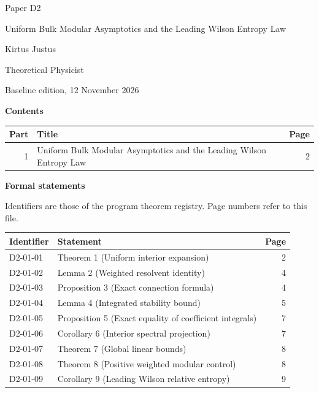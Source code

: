 \documentclass[11pt,a4paper]{article}
\begin{document}
\thispagestyle{empty}\pagestyle{empty}
{\small\sffamily \ProgramTitle\hfill Paper D2\par}
\vspace*{12mm}
{\LARGE\bfseries\raggedright{} Uniform Bulk Modular Asymptotics and the Leading Wilson Entropy Law\par}
\vspace{9mm}
{\large Kirtus Justus\par}\vspace{1mm}Theoretical Physicist\par\AuthorLocation\par\vspace{2mm}Baseline edition, 12 November 2026\par\vspace{8mm}
\textbf{Contents}\par\vspace{1mm}
{\small\begin{longtable}{@{}r>{\raggedright\arraybackslash}p{}r@{}}
\toprule Part & Title & Page\\\midrule\endhead
1 & Uniform Bulk Modular Asymptotics and the Leading Wilson Entropy Law & 2\\
\bottomrule\end{longtable}}
\vspace{2mm}\textbf{Formal statements}\par\vspace{1mm}
{\footnotesize Identifiers are those of the program theorem registry. Page numbers refer to this file.\par}
{\footnotesize\begin{longtable}{@{}l>{\raggedright\arraybackslash}p{}r@{}}
\toprule Identifier & Statement & Page\\\midrule\endhead
D2-01-01 & Theorem 1 (Uniform interior expansion) & 2\\
D2-01-02 & Lemma 2 (Weighted resolvent identity) & 4\\
D2-01-03 & Proposition 3 (Exact connection formula) & 4\\
D2-01-04 & Lemma 4 (Integrated stability bound) & 5\\
D2-01-05 & Proposition 5 (Exact equality of coefficient integrals) & 7\\
D2-01-06 & Corollary 6 (Interior spectral projection) & 7\\
D2-01-07 & Theorem 7 (Global linear bounds) & 8\\
D2-01-08 & Theorem 8 (Positive weighted modular control) & 8\\
D2-01-09 & Corollary 9 (Leading Wilson relative entropy) & 9\\
\bottomrule\end{longtable}}
\end{document}
